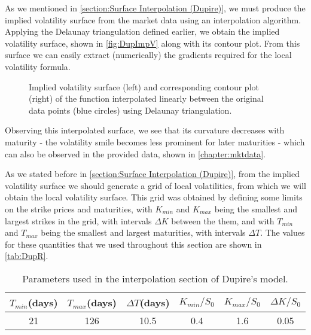As we mentioned in \autoref{section:Surface Interpolation (Dupire)}, we must produce the implied volatility surface from the market data using an interpolation algorithm. Applying the Delaunay triangulation defined earlier, we obtain the implied volatility surface, shown in \autoref{fig:DupImpV} along with its contour plot.
From this surface we can easily extract (numerically) the gradients required for the local volatility formula.



\begin{figure}[H]
  \begin{subfigmatrix}{2}
  \end{subfigmatrix}
    \caption[Implied volatility surface and corresponding contour plot of the function interpolated linearly between the original data points using Delaunay triangulation.]{Implied volatility surface (left) and corresponding contour plot (right) of the function interpolated linearly between the original data points (blue circles) using Delaunay triangulation.}\label{fig:DupImpV}
\end{figure}   


Observing this interpolated surface, we see that its curvature decreases with maturity - the volatility smile becomes less prominent for later maturities - which can also be observed in the provided data, shown in \autoref{chapter:mktdata}.

As we stated before in \autoref{section:Surface Interpolation (Dupire)}, from the implied volatility surface we should generate a grid of local volatilities, from which we will obtain the local volatility surface. This grid was obtained by defining some limits on the strike prices and maturities, with $K_{min}$ and $K_{max}$ being the smallest and largest strikes in the grid, with intervals $\Delta K$ between the them, and with $T_{min}$ and $T_{max}$ being the smallest and largest maturities, with intervals $\Delta T$. The values for these quantities that we used throughout this section are shown in \autoref{tab:DupR}.


\begin{table}[H]
    \centering
        \renewcommand{\arraystretch}{0.8}
\begin{tabular}{@{}cccccc@{}}
\toprule
$T_{min}$(days) & $T_{max}$(days) & $\Delta T$(days) & $K_{min}/S_0$ & $K_{max}/S_0$ & \multicolumn{1}{c}{$\Delta K/S_0$}\\ \midrule
21 & 126 & 10.5 & 0.4 & 1.6 & \multicolumn{1}{c}{0.05} \\ \bottomrule
\end{tabular}
  \caption[Parameters used in the interpolation section of Dupire's model.]{Parameters used in the interpolation section of Dupire's model.}
  \label{tab:DupR}
\end{table}

